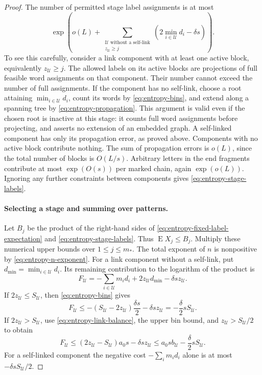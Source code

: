 \begin{proof}
The number of permitted stage label assignments is at most
\begin{equation}
 \exp\left(o(L)+
 \sum_{\substack{\mathcal U\text{ without a self-link}\\
                         z_{\mathcal U}\ge j}}
       \left(2\min_{i\in\mathcal U}d_i-\delta s\right)\right).
 \label{eq:entropy-stage-labels}
\end{equation}
To see this carefully, consider a link component with at least one
active block, equivalently \(z_{\mathcal U}\ge j\).  The allowed labels
on its active blocks are projections of full feasible word assignments
on that component.  Their number cannot exceed the number of full
assignments.  If the component has no self-link, choose a root attaining
\(\min_{i\in\mathcal U}d_i\), count its words by
\eqref{eq:entropy-bins}, and extend along a spanning tree by
\eqref{eq:entropy-propagation}.  This argument is valid even if the
chosen root is inactive at this stage: it counts full word assignments
before projecting, and asserts no extension of an embedded graph.
A self-linked component has only its propagation error, as proved
above.  Components with no active block contribute nothing.  The sum
of propagation errors is \(o(L)\), since the total number of blocks is
\(O(L/s)\).  Arbitrary letters in the end fragments contribute at most
\(\exp(O(s))\) per marked chain, again \(\exp(o(L))\).  Ignoring any
further constraints between components gives
\eqref{eq:entropy-stage-labels}.

\paragraph{Selecting a stage and summing over patterns.}
Let \(B_j\) be the product of the right-hand sides of
\eqref{eq:entropy-fixed-label-expectation} and
\eqref{eq:entropy-stage-labels}.  Thus \(\operatorname{E}X_j\le B_j\).
Multiply these numerical upper bounds over
\(1\le j\le m_*\).  The total exponent of \(n\) is nonpositive by
\eqref{eq:entropy-n-exponent}.  For a link component without a self-link,
put \(d_{\min}=\min_{i\in\mathcal U}d_i\).  Its remaining contribution
to the logarithm of the product is
\[
 F_{\mathcal U}
 =-\sum_{i\in\mathcal U}m_i d_i
       +2z_{\mathcal U}d_{\min}-\delta s z_{\mathcal U}.
\]
If \(2z_{\mathcal U}\le S_{\mathcal U}\), then
\eqref{eq:entropy-bins} gives
\[
 F_{\mathcal U}
 \le-(S_{\mathcal U}-2z_{\mathcal U})\frac{\delta s}{2}
       -\delta s z_{\mathcal U}
 =-\frac{\delta}{2}sS_{\mathcal U}.
\]
If \(2z_{\mathcal U}>S_{\mathcal U}\), use
\eqref{eq:entropy-link-balance}, the upper bin bound, and
\(z_{\mathcal U}>S_{\mathcal U}/2\) to obtain
\[
 F_{\mathcal U}
 \le(2z_{\mathcal U}-S_{\mathcal U})a_0s
       -\delta s z_{\mathcal U}
 \le a_0s b_{\mathcal U}-\frac{\delta}{2}sS_{\mathcal U}.
\]
For a self-linked component the negative cost
\(-\sum_i m_i d_i\) alone is at most
\(-\delta sS_{\mathcal U}/2\).


\end{proof}
